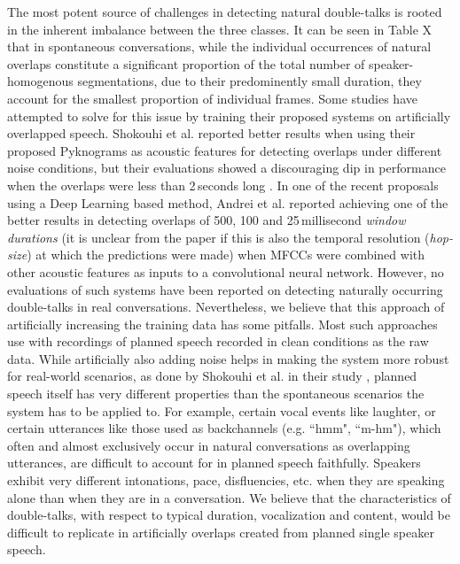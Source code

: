 \documentclass[a4paper]{article}
\begin{document}
The most potent source of challenges in detecting natural double-talks is rooted in the inherent imbalance between the three classes.
It can be seen in Table X that in spontaneous conversations,  %
while the individual occurrences of natural overlaps constitute a significant proportion of the total number of speaker-homogenous segmentations,
due to their predominently small duration, they account for the smallest proportion of individual frames.
Some studies have attempted to solve for this issue by training their proposed systems on artificially overlapped speech.  %
Shokouhi et al. reported better results when using their proposed Pyknograms as acoustic features for detecting overlaps under different noise conditions,
but their evaluations showed a discouraging dip in performance when the overlaps were less than 2\,seconds long \cite{shokouhi_teager_2017}.
In one of the recent proposals using a Deep Learning based method,
Andrei et al. reported achieving one of the better results in detecting overlaps of 500, 100 and 25\,millisecond \textit{window durations} \cite{AndreiDetectingOverlappedSpeech2017}
(it is unclear from the paper if this is also the temporal resolution (\textit{hop-size}) at which the predictions were made)
when MFCCs were combined with other acoustic features as inputs to a convolutional neural network.
However, no evaluations of such systems have been reported on detecting naturally occurring double-talks in real conversations.
Nevertheless, we believe that this approach of artificially increasing the training data has some pitfalls.
Most such approaches use with recordings of planned speech recorded in clean conditions as the raw data.
While artificially also adding noise helps in making the system more robust for real-world scenarios,
as done by Shokouhi et al. in their study \cite{shokouhi_teager_2017},
planned speech itself has very different properties than the spontaneous scenarios the system has to be applied to.
For example, certain vocal events like laughter, or certain utterances like those used as backchannels (e.g. “hmm", “m-hm"), which often and almost exclusively occur in natural conversations as overlapping utterances,
are difficult to account for in planned speech faithfully.
Speakers exhibit very different intonations, pace, disfluencies, etc. when they are speaking alone than when they are in a conversation.
We believe that the characteristics of double-talks,
with respect to typical duration, vocalization and content,
would be difficult to replicate in artificially overlaps created from planned single speaker speech.
\end{document}
